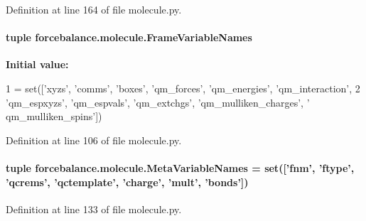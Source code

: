 Definition at line 164 of file molecule.\-py.

\hypertarget{namespaceforcebalance_1_1molecule_a0044fa397e0923635a8b3e9625aa70f7}{
\paragraph[{Frame\-Variable\-Names}]{\setlength{\rightskip}{0pt plus 5cm}tuple forcebalance.\-molecule.\-Frame\-Variable\-Names}}\label{namespaceforcebalance_1_1molecule_a0044fa397e0923635a8b3e9625aa70f7}
{\bfseries Initial value\-:}
\begin{DoxyCode}
1 = set([\textcolor{stringliteral}{'xyzs'}, \textcolor{stringliteral}{'comms'}, \textcolor{stringliteral}{'boxes'}, \textcolor{stringliteral}{'qm\_forces'}, \textcolor{stringliteral}{'qm\_energies'}, \textcolor{stringliteral}{'qm\_interaction'}, 
2                           \textcolor{stringliteral}{'qm\_espxyzs'}, \textcolor{stringliteral}{'qm\_espvals'}, \textcolor{stringliteral}{'qm\_extchgs'}, \textcolor{stringliteral}{'qm\_mulliken\_charges'}, \textcolor{stringliteral}{'
      qm\_mulliken\_spins'}])
\end{DoxyCode}


Definition at line 106 of file molecule.\-py.

\hypertarget{namespaceforcebalance_1_1molecule_a38e1c99e9567fe42b792af43db9b7488}{
\paragraph[{Meta\-Variable\-Names}]{\setlength{\rightskip}{0pt plus 5cm}tuple forcebalance.\-molecule.\-Meta\-Variable\-Names = set(\mbox{[}'fnm', 'ftype', 'qcrems', 'qctemplate', 'charge', 'mult', 'bonds'\mbox{]})}}\label{namespaceforcebalance_1_1molecule_a38e1c99e9567fe42b792af43db9b7488}


Definition at line 133 of file molecule.\-py.

